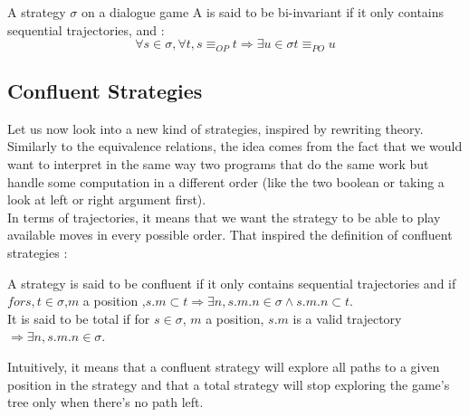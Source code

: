 \documentclass[a4paper,UKenglish]{lipics}
\begin{document}
\begin{definition}
A strategy $\sigma$ on a dialogue game A is said to be bi-invariant if it only contains sequential trajectories, and : $$\forall s \in \sigma,\forall t, s \equiv_{OP} t \Rightarrow \exists u \in \sigma t \equiv_{PO} u$$
\end{definition}


\subsection{Confluent Strategies}
Let us now look into a new kind of strategies, inspired by rewriting theory. Similarly to the equivalence relations,  the idea comes from the fact that we would want to interpret in the same way two programs that do the same work but handle some computation in a different order (like the two boolean or taking a look at left or right argument first).\\ In terms of trajectories, it means that we want the strategy to be able to play available moves in every possible order. That inspired the definition of confluent strategies : 
\begin{definition}
A strategy is said to be confluent if it only contains sequential trajectories and if $for s,t \in \sigma$,$m$ a position ,$ s.m \subset t \Rightarrow \exists n, s.m.n \in \sigma \wedge s.m.n \subset t$.\\
It is said to be total if for $s \in \sigma$, $m$ a position, $s.m$ is a valid trajectory $\Rightarrow \exists n, s.m.n \in \sigma$.
\end{definition}
Intuitively, it means that a confluent strategy will explore all paths to a given position in the strategy and that a total strategy will stop exploring the game's tree only when there's no path left.\\
\end{document}
